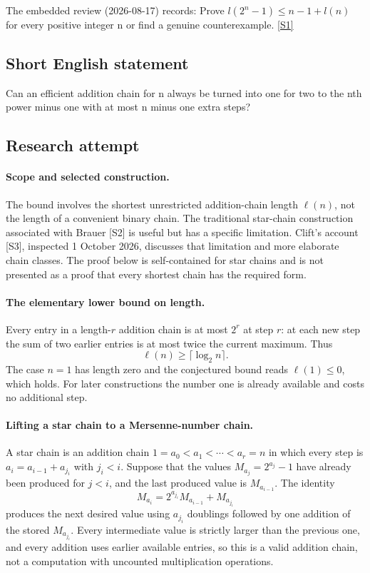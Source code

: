 \documentclass[11pt,a4paper]{article}
\newcommand{\sref}[2]{\hyperlink{source:#1:#2}{[S#2]}}
\begin{document}
The embedded review (2026-08-17) records: Prove $l(2^n-1)\leq n-1+l(n)$ for every positive integer n or find a genuine counterexample. \sref{1246}{1}

\subsection{Short English statement}

Can an efficient addition chain for n always be turned into one for two to the nth power minus one with at most n minus one extra steps?

\subsection{Research attempt}

\paragraph{Scope and selected construction.}
The bound involves the shortest unrestricted addition-chain length
$\ell(n)$, not the length of a convenient binary chain. The traditional
star-chain construction associated with Brauer [S2] is useful but has a
specific limitation. Clift's account [S3], inspected 1 October 2026,
discusses that limitation and more elaborate chain classes. The proof
below is self-contained for star chains and is not presented as a proof
that every shortest chain has the required form.

\paragraph{The elementary lower bound on length.}
Every entry in a length-$r$ addition chain is at most $2^r$ at step $r$:
at each new step the sum of two earlier entries is at most twice the
current maximum. Thus
\[
                      \ell(n)\ge\lceil\log_2n\rceil.
\]
The case $n=1$ has length zero and the conjectured bound reads
$\ell(1)\le0$, which holds. For later constructions the number one is
already available and costs no additional step.

\paragraph{Lifting a star chain to a Mersenne-number chain.}
A star chain is an addition chain
$1=a_0<a_1<\cdots<a_r=n$ in which every step is
$a_i=a_{i-1}+a_{j_i}$ with $j_i<i$. Suppose that the values
$M_{a_j}=2^{a_j}-1$ have already been produced for $j<i$, and the
last produced value is $M_{a_{i-1}}$. The identity
\[
 M_{a_i}=2^{a_{j_i}}M_{a_{i-1}}+M_{a_{j_i}}
\]
produces the next desired value using $a_{j_i}$ doublings followed by
one addition of the stored $M_{a_{j_i}}$. Every intermediate value is
strictly larger than the previous one, and every addition uses earlier
available entries, so this is a valid addition chain, not a computation
with uncounted multiplication operations.
\end{document}

